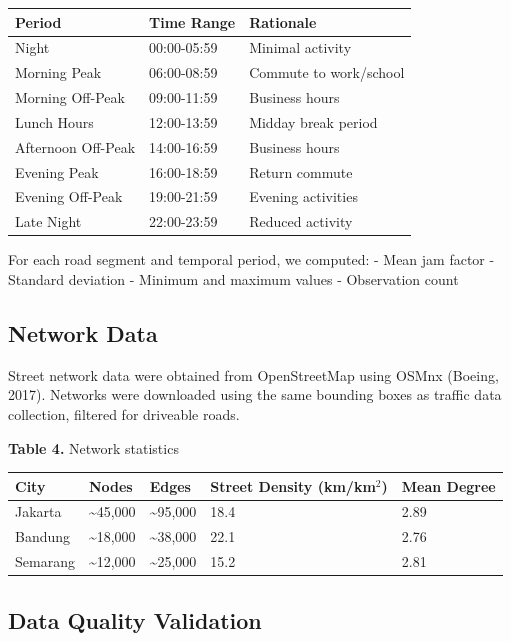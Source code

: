 \documentclass[12pt,a4paper]{article}
\begin{document}
\begin{longtable}[]{@{}lll@{}}
\toprule\noalign{}
Period & Time Range & Rationale \\
\midrule\noalign{}
\endhead
\bottomrule\noalign{}
\endlastfoot
Night & 00:00-05:59 & Minimal activity \\
Morning Peak & 06:00-08:59 & Commute to work/school \\
Morning Off-Peak & 09:00-11:59 & Business hours \\
Lunch Hours & 12:00-13:59 & Midday break period \\
Afternoon Off-Peak & 14:00-16:59 & Business hours \\
Evening Peak & 16:00-18:59 & Return commute \\
Evening Off-Peak & 19:00-21:59 & Evening activities \\
Late Night & 22:00-23:59 & Reduced activity \\
\end{longtable}

For each road segment and temporal period, we computed: - Mean jam factor - Standard deviation - Minimum and maximum values - Observation count

\subsection{Network Data}

Street network data were obtained from OpenStreetMap using OSMnx (Boeing, 2017). Networks were downloaded using the same bounding boxes as traffic data collection, filtered for driveable roads.

\textbf{Table 4.} Network statistics

\begin{longtable}[]{@{}lllll@{}}
\toprule\noalign{}
City & Nodes & Edges & Street Density (km/km$^2$) & Mean Degree \\
\midrule\noalign{}
\endhead
\bottomrule\noalign{}
\endlastfoot
Jakarta & \textasciitilde45,000 & \textasciitilde95,000 & 18.4 & 2.89 \\
Bandung & \textasciitilde18,000 & \textasciitilde38,000 & 22.1 & 2.76 \\
Semarang & \textasciitilde12,000 & \textasciitilde25,000 & 15.2 & 2.81 \\
\end{longtable}

\subsection{Data Quality Validation}
\end{document}
